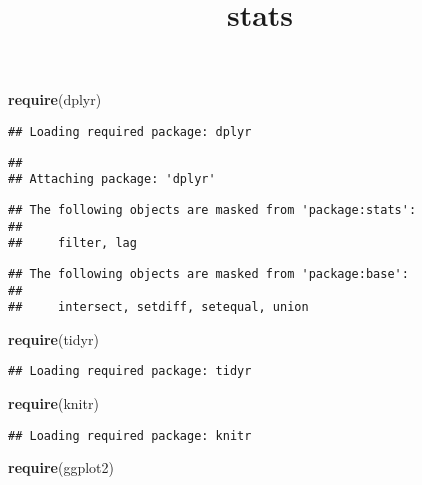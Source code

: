\documentclass[]{article}
\title{stats}
\author{}
\date{}
\newenvironment{Shaded}{\begin{snugshade}}{\end{snugshade}}
\newcommand{\KeywordTok}[1]{\textcolor[rgb]{0.13,0.29,0.53}{\textbf{#1}}}
\newcommand{\NormalTok}[1]{#1}
\begin{document}
\maketitle

\begin{Shaded}
\begin{Highlighting}[]
\KeywordTok{require}\NormalTok{(dplyr)}
\end{Highlighting}
\end{Shaded}

\begin{verbatim}
## Loading required package: dplyr
\end{verbatim}

\begin{verbatim}
## 
## Attaching package: 'dplyr'
\end{verbatim}

\begin{verbatim}
## The following objects are masked from 'package:stats':
## 
##     filter, lag
\end{verbatim}

\begin{verbatim}
## The following objects are masked from 'package:base':
## 
##     intersect, setdiff, setequal, union
\end{verbatim}

\begin{Shaded}
\begin{Highlighting}[]
\KeywordTok{require}\NormalTok{(tidyr)}
\end{Highlighting}
\end{Shaded}

\begin{verbatim}
## Loading required package: tidyr
\end{verbatim}

\begin{Shaded}
\begin{Highlighting}[]
\KeywordTok{require}\NormalTok{(knitr)}
\end{Highlighting}
\end{Shaded}

\begin{verbatim}
## Loading required package: knitr
\end{verbatim}

\begin{Shaded}
\begin{Highlighting}[]
\KeywordTok{require}\NormalTok{(ggplot2)}
\end{Highlighting}
\end{Shaded}
\end{document}
